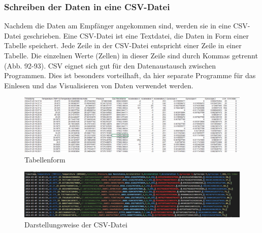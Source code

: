 \subsubsection{Schreiben der Daten in eine CSV-Datei}\label{csv}
Nachdem die Daten am Empfänger angekommen sind, werden sie in eine CSV-Datei geschrieben. Eine CSV-Datei ist eine Textdatei, die Daten in Form einer Tabelle speichert. Jede Zeile in der CSV-Datei entspricht einer Zeile in einer Tabelle. Die einzelnen Werte (Zellen) in dieser Zeile sind durch Kommas getrennt (Abb. 92-93).  CSV eignet sich gut für den Datenaustausch zwischen Programmen. Dies ist besonders vorteilhaft, da hier separate Programme für das Einlesen und  das Visualisieren von Daten verwendet werden.
\vspace{3mm}
\begin{figure}[H]
	\centering
	\includegraphics{image/tabellen.png}
	\caption{Tabellenform}
\end{figure}
\vspace{3mm}
\begin{figure}[H]
	\centering
	\includegraphics{image/darstellung.png}
	\caption{Darstellungsweise der CSV-Datei}
\end{figure}

